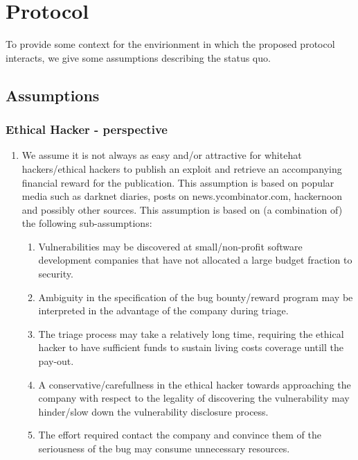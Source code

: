 \section{Protocol}
\label{sec:protocol}
To provide some context for the envirionment in which the proposed protocol interacts, we give some assumptions describing the status quo.

\subsection{Assumptions}
\subsubsection{Ethical Hacker - perspective}
\begin{enumerate}
	\item We assume it is not always as easy and/or attractive for whitehat hackers/ethical hackers to publish an exploit and retrieve an accompanying financial reward for the publication. This assumption is based on popular media such as darknet diaries, posts on news.ycombinator.com, hackernoon and possibly other sources. This assumption is based on (a combination of) the following sub-assumptions:
	\begin{enumerate}
		\item Vulnerabilities may be discovered at small/non-profit software development companies that have not allocated a large budget fraction to security.
		\item Ambiguity in the specification of the bug bounty/reward program may be interpreted in the advantage of the company during triage.
		\item The triage process may take a relatively long time, requiring the ethical hacker to have sufficient funds to sustain living costs coverage untill the pay-out.
		\item A conservative/carefullness in the ethical hacker towards approaching the company with respect to the legality of discovering the vulnerability may hinder/slow down the vulnerability disclosure process.
		\item The effort required contact the company and convince them of the seriousness of the bug may consume unnecessary resources.
	\end{enumerate}
\end{enumerate}

